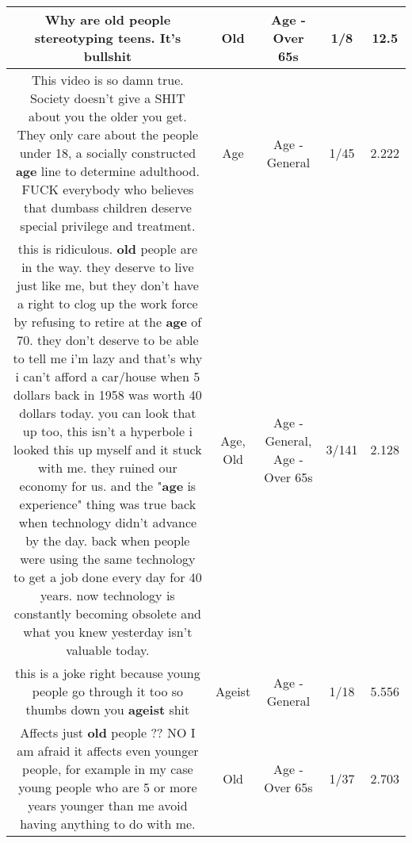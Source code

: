 \documentclass[11pt]{article}
\newlength\mylength
\begin{document}
\begin{center}
\begin{longtable}{|C{.65\mylength}|C{.30\mylength}|C{.12\mylength}|C{.12\mylength}|C{.12\mylength}|}
  \small Why are \textbf{old} people stereotyping teens. It's bullshit\normalsize   & Old & Age - Over 65s & 1/8 & 12.5 \\  \hline
  \small This video is so damn true. Society doesn't give a SHIT about you the older you get. They only care about the people under 18, a socially constructed \textbf{age} line to determine adulthood. FUCK everybody who believes that dumbass children deserve special privilege and treatment.\normalsize   & Age & Age - General & 1/45 & 2.222 \\  \hline
  \small this is ridiculous. \textbf{old} people are in the way. they deserve to live just like me, but they don't have a right to clog up the work force by refusing to retire at the \textbf{age} of 70. they don't deserve to be able to tell me i'm lazy and that's why i can't afford a car/house when 5 dollars back in 1958 was worth 40 dollars today. you can look that up too, this isn't a hyperbole i looked this up myself and it stuck with me. they ruined our economy for us. and the "\textbf{age} is experience" thing was true back when technology didn't advance by the day. back when people were using the same technology to get a job done every day for 40 years. now technology is constantly becoming obsolete and what you knew yesterday isn't valuable today.\normalsize   & Age, Old & Age - General, Age - Over 65s & 3/141 & 2.128 \\  \hline
  \small this is a joke right because young people go through it too so thumbs down you \textbf{ageist} shit\normalsize   & Ageist & Age - General & 1/18 & 5.556 \\  \hline
  \small Affects just \textbf{old} people ?? NO I am afraid it affects even younger people, for example in my case young people who are 5 or more years younger than me avoid having anything to do with me.\normalsize   & Old & Age - Over 65s & 1/37 & 2.703 \\  \hline
  
\end{longtable}
\end{center}
\end{document}

